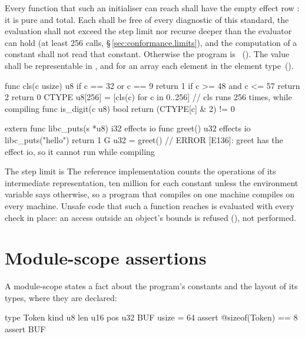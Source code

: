 \begin{constraint}
  Every function that such an initialiser can reach shall have the empty effect row
  : it is pure and total. Each shall be free of every diagnostic of
  this standard, the evaluation shall not exceed the step limit nor recurse deeper than the
  evaluator can hold (at least 256 calls, \S\,\ref{sec:conformance.limits}), and the computation
  of a constant shall not read that constant. Otherwise the program is \illformed{}~().
  The value shall be representable in , and for an array each element in the element
  type~().
\end{constraint}

\begin{laincode}
func cls(c usize) u8 {
    if c == 32 or c == 9 { return 1 }
    if c >= 48 and c <= 57 { return 2 }
    return 0
}
CTYPE u8[256] = [cls(c) for c in 0..256]    // cls runs 256 times, while compiling
func is_digit(c u8) bool {
    return (CTYPE[c] & 2) != 0
}
\end{laincode}

\begin{laincode}
extern func libc_puts(s *u8) i32 effects io
func greet() u32 effects io {
    libc_puts("hello")
    return 1
}
G u32 = greet()          // ERROR [E136]: greet has the effect io, so it cannot run while compiling
\end{laincode}

\pnum
The step limit is  The reference
implementation counts the operations of its intermediate representation, ten million for each
constant unless the environment variable  says otherwise, so a program
that compiles on one machine compiles on every machine. Unsafe code that such a function reaches
is evaluated with every check in place: an access outside an object's bounds is refused
(), not performed.

\section{Module-scope assertions}
\label{sec:decl.static-assert}

\pnum
A module-scope  states a fact about the program's constants and the layout of its
types, where they are declared:

\begin{laincode}
type Token {
    kind u8
    len  u16
    pos  u32
}
BUF usize = 64
assert @sizeof(Token) == 8
assert BUF %
\end{laincode}

